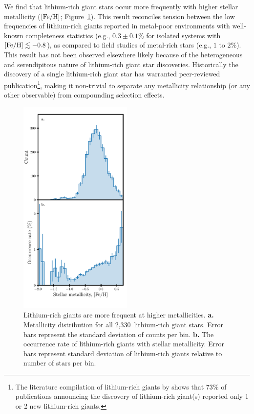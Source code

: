 \documentclass[twocolumn]{aastex62}
\newcommand{\SampleSize}{2,330}
\begin{document}
We find that lithium-rich giant stars occur more frequently with higher stellar 
metallicity ($[{\rm Fe/H}]$; Figure~\ref{fig:mdf_frequency}). This result 
reconciles tension between the low frequencies of lithium-rich giants reported 
in metal-poor environments with well-known completeness statistics \citep{Kirby_2016} 
(e.g., $0.3 \pm 0.1$\% for isolated systems with $[{\rm Fe/H}] \lesssim -0.8$), 
as compared to field studies of metal-rich stars \citep{Brown_1989} (e.g., $1$ to $2$\%). 
This result has not been observed elsewhere likely because of the heterogeneous and 
serendipitous nature of lithium-rich giant star discoveries. Historically the 
discovery of a single lithium-rich giant star has warranted peer-reviewed 
publication\footnote{The literature compilation of lithium-rich giants by \citet{Casey_2016} shows that 73\% of publications announcing the discovery of lithium-rich giant(s) reported only 1 or 2 new lithium-rich giants.}, making it non-trivial to separate any metallicity 
relationship (or any other observable) from compounding selection effects.

\begin{figure}
	\centering
	\includegraphics[width=0.5\textwidth]{fraction_wrt_mh}
	\caption{
		Lithium-rich giants are more frequent at higher metallicities.
		\textbf{a.} Metallicity distribution for all
		\SampleSize\ lithium-rich giant stars. Error bars represent the standard deviation of counts per bin.
		\textbf{b.} The occurrence 
		rate of lithium-rich giants with stellar metallicity. Error bars represent standard deviation of lithium-rich giants relative to number of stars per bin.}
	\label{fig:mdf_frequency}
\end{figure} 
\end{document}
